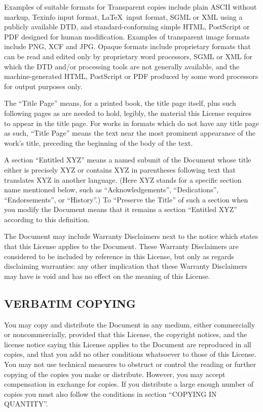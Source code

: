 \documentclass[a4paper,german,10pt,twoside]{book}
\begin{document}
{\begin{appendix}
{Examples of suitable formats for Transparent copies include plain ASCII without markup, Texinfo
input format, \LaTeX\ input format, SGML or XML using a publicly available DTD, and
standard-conforming simple HTML, PostScript or PDF designed for human modification.	 Examples of
transparent image formats include PNG, XCF and JPG.	 Opaque formats include proprietary formats
that can be read and edited only by proprietary word processors, SGML or XML for which the DTD
and/or processing tools are not generally available, and the machine-generated HTML, PostScript or
PDF produced by some word processors for output purposes only.

The ``Title Page'' means, for a printed book, the title page itself, plus such following pages as
are needed to hold, legibly, the material this License requires to appear in the title page.  For
works in formats which do not have any title page as such, ``Title Page'' means the text near the
most prominent appearance of the work's title, preceding the beginning of the body of the text.

A section ``Entitled XYZ'' means a named subunit of the Document whose title either is precisely
XYZ or contains XYZ in parentheses following text that translates XYZ in another language.	(Here
XYZ stands for a specific section name mentioned below, such as ``Acknowledgements'',
``Dedications'', ``Endorsements'', or ``History''.)	 To ``Preserve the Title'' of such a section
when you modify the Document means that it remains a section ``Entitled XYZ'' according to this
definition.

The Document may include Warranty Disclaimers next to the notice which states that this License
applies to the Document.  These Warranty Disclaimers are considered to be included by reference in
this License, but only as regards disclaiming warranties: any other implication that these Warranty
Disclaimers may have is void and has no effect on the meaning of this License.


\subsection*{VERBATIM COPYING}
\label{verbatim}

You may copy and distribute the Document in any medium, either commercially or noncommercially,
provided that this License, the copyright notices, and the license notice saying this License
applies to the Document are reproduced in all copies, and that you add no other conditions
whatsoever to those of this License.  You may not use technical measures to obstruct or control the
reading or further copying of the copies you make or distribute.  However, you may accept
compensation in exchange for copies.  If you distribute a large enough number of copies you must
also follow the conditions in section ``COPYING IN QUANTITY''.

}
\end{appendix}}
\end{document}
